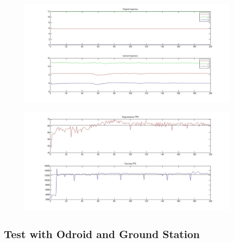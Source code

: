 	\begin{figure}[ht]
		\centering
		\includegraphics[width=\linewidth]{../Images/c4/trajs}
		\caption{}
		\label{fig:trajectories_PC}
	\end{figure}
	
	\begin{figure}[ht]
		\centering
		\includegraphics[width=\linewidth]{../Images/c4/fps}
		\caption{}
		\label{fig:fps_PC}
	\end{figure}
		

	

	
\subsection{Test with Odroid and Ground Station}